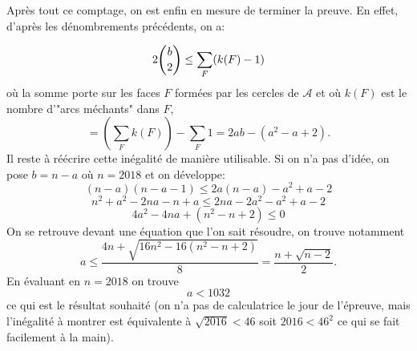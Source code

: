 \begin{sol}
Après tout ce comptage, on est enfin en mesure de terminer la preuve. En effet, d'après les dénombrements précédents, on a:

$$2\dbinom b2\le \sum_{F} (k(F)-1)$$
où la somme porte sur les faces $F$ formées par les cercles de $\mathcal{A}$ et où $k(F)$ est le nombre d'"arcs méchants" dans $F$,
$$=\left(\sum_F k(F)\right)-\sum_F 1=2ab - (a^2-a+2).$$
Il reste à réécrire cette inégalité de manière utilisable. Si on n'a pas d'idée, on pose $b=n-a$ où $n=2018$ et on développe:
$$(n-a)(n-a-1)\le 2a(n-a)-a^2+a-2$$
$$n^2+a^2-2na-n+a\le 2na-2a^2-a^2+a-2$$
$$4a^2-4na+(n^2-n+2)\le 0$$
On se retrouve devant une équation que l'on sait résoudre, on trouve notamment
$$a\le \frac{4n+\sqrt{16n^2-16(n^2-n+2)}}{8}= \frac{n+\sqrt{n-2}}2.$$
En évaluant en $n=2018$ on trouve
$$a< 1032$$
ce qui est le résultat souhaité (on n'a pas de calculatrice le jour de l'épreuve, mais l'inégalité à montrer est équivalente à $\sqrt{2016}< 46$ soit $2016< 46^2$ ce qui se fait facilement à la main).
\end{sol}